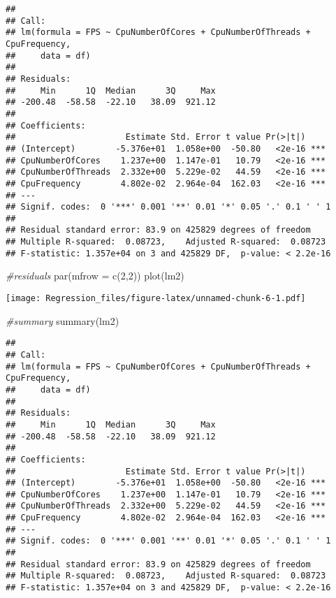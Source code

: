 \documentclass[
]{article}
\newenvironment{Shaded}{\begin{snugshade}}{\end{snugshade}}
\newcommand{\AttributeTok}[1]{\textcolor[rgb]{0.77,0.63,0.00}{#1}}
\newcommand{\CommentTok}[1]{\textcolor[rgb]{0.56,0.35,0.01}{\textit{#1}}}
\newcommand{\DecValTok}[1]{\textcolor[rgb]{0.00,0.00,0.81}{#1}}
\newcommand{\FunctionTok}[1]{\textcolor[rgb]{0.00,0.00,0.00}{#1}}
\newcommand{\NormalTok}[1]{#1}
\begin{document}
\begin{verbatim}
## 
## Call:
## lm(formula = FPS ~ CpuNumberOfCores + CpuNumberOfThreads + CpuFrequency, 
##     data = df)
## 
## Residuals:
##     Min      1Q  Median      3Q     Max 
## -200.48  -58.58  -22.10   38.09  921.12 
## 
## Coefficients:
##                      Estimate Std. Error t value Pr(>|t|)    
## (Intercept)        -5.376e+01  1.058e+00  -50.80   <2e-16 ***
## CpuNumberOfCores    1.237e+00  1.147e-01   10.79   <2e-16 ***
## CpuNumberOfThreads  2.332e+00  5.229e-02   44.59   <2e-16 ***
## CpuFrequency        4.802e-02  2.964e-04  162.03   <2e-16 ***
## ---
## Signif. codes:  0 '***' 0.001 '**' 0.01 '*' 0.05 '.' 0.1 ' ' 1
## 
## Residual standard error: 83.9 on 425829 degrees of freedom
## Multiple R-squared:  0.08723,    Adjusted R-squared:  0.08723 
## F-statistic: 1.357e+04 on 3 and 425829 DF,  p-value: < 2.2e-16
\end{verbatim}

\begin{Shaded}
\begin{Highlighting}[]
\CommentTok{\#residuals}
\FunctionTok{par}\NormalTok{(}\AttributeTok{mfrow =} \FunctionTok{c}\NormalTok{(}\DecValTok{2}\NormalTok{,}\DecValTok{2}\NormalTok{))}
\FunctionTok{plot}\NormalTok{(lm2)}
\end{Highlighting}
\end{Shaded}

\texttt{[image: Regression\_files/figure-latex/unnamed-chunk-6-1.pdf]}

\begin{Shaded}
\begin{Highlighting}[]
\CommentTok{\#summary}
\FunctionTok{summary}\NormalTok{(lm2)}
\end{Highlighting}
\end{Shaded}

\begin{verbatim}
## 
## Call:
## lm(formula = FPS ~ CpuNumberOfCores + CpuNumberOfThreads + CpuFrequency, 
##     data = df)
## 
## Residuals:
##     Min      1Q  Median      3Q     Max 
## -200.48  -58.58  -22.10   38.09  921.12 
## 
## Coefficients:
##                      Estimate Std. Error t value Pr(>|t|)    
## (Intercept)        -5.376e+01  1.058e+00  -50.80   <2e-16 ***
## CpuNumberOfCores    1.237e+00  1.147e-01   10.79   <2e-16 ***
## CpuNumberOfThreads  2.332e+00  5.229e-02   44.59   <2e-16 ***
## CpuFrequency        4.802e-02  2.964e-04  162.03   <2e-16 ***
## ---
## Signif. codes:  0 '***' 0.001 '**' 0.01 '*' 0.05 '.' 0.1 ' ' 1
## 
## Residual standard error: 83.9 on 425829 degrees of freedom
## Multiple R-squared:  0.08723,    Adjusted R-squared:  0.08723 
## F-statistic: 1.357e+04 on 3 and 425829 DF,  p-value: < 2.2e-16
\end{verbatim}
\end{document}
